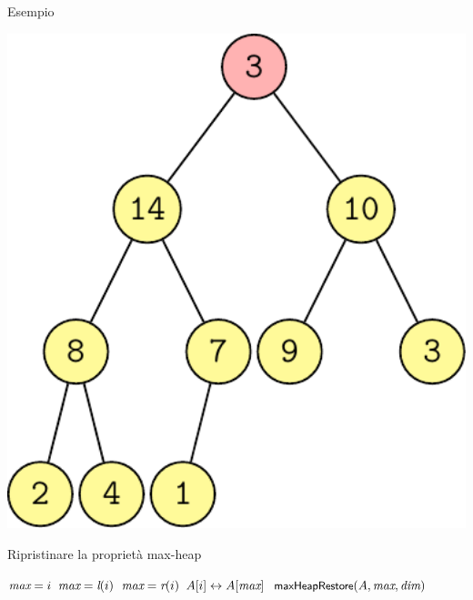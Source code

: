 \begin{frame}{Esempio}
\begin{overprint}[0.5\textwidth]
\includegraphics[width=1.0\textwidth,page=7]{esempio-errato.pdf}
\end{overprint}

\end{frame}    

\begin{frame}{Ripristinare la proprietà max-heap}

\begin{Procedure}
\caption[A]{\maxheapify($\Item[\,]\ A$, \INTEGER $i$, \INTEGER \heapcount)}

\INTEGER $\textit{max} = i$\;
{
  $\textit{max} = \textit{l}(i)$
}
{
  $\textit{max} = \textit{r}(i)$
}
{
  $A[i] \leftrightarrow A[\textit{max}]$\;
  $\textsf{{\small maxHeapRestore}}(A, \textit{max}, \textit{dim})$\;
}
\end{Procedure}


\end{frame}

